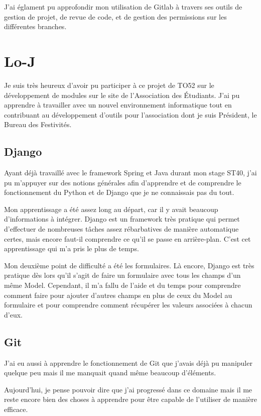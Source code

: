 \documentclass[a4paper]{report}
\begin{document}
\par J'ai églament pu approfondir mon utilisation de Gitlab à travers ses outils de gestion de projet, de revue de code,
et de gestion des permissions sur les différentes branches.

\section{Lo-J}
\label{sec:lo_j}
\par Je suis très heureux d'avoir pu participer à ce projet de TO52 sur le développement de modules sur le site de
l'Association des Étudiants. J'ai pu apprendre à travailler avec un nouvel environnement informatique tout en
contribuant au développement d'outils pour l'association dont je suis Président, le Bureau des Festivités.

\subsection{Django}
\par Ayant déjà travaillé avec le framework Spring et Java durant mon stage ST40, j'ai pu m'appuyer sur des notions
générales afin d'apprendre et de comprendre le fonctionnement du Python et de Django que je ne connaissais pas du tout.

\par Mon apprentissage a été assez long au départ, car il y avait beaucoup d'informations à intégrer. Django est un
framework très pratique qui permet d'effectuer de nombreuses tâches assez rébarbatives de manière automatique certes,
mais encore faut-il comprendre ce qu'il se passe en arrière-plan. C'est cet apprentissage qui m'a pris le plus de temps.

\par Mon deuxième point de difficulté a été les formulaires. Là encore, Django est très pratique dès lors qu'il s'agit
de faire un formulaire avec tous les champs d'un même Model. Cependant, il m'a fallu de l'aide et du temps pour
comprendre comment faire pour ajouter d'autres champs en plus de ceux du Model au formulaire et pour comprendre comment
récupérer les valeurs associées à chacun d'eux.

\subsection{Git}
\par J'ai eu aussi à apprendre le fonctionnement de Git que j'avais déjà pu manipuler quelque peu mais il me manquait
quand même beaucoup d'éléments.

\par Aujourd'hui, je pense pouvoir dire que j'ai progressé dans ce domaine mais il me reste encore bien des choses à
apprendre pour être capable de l'utiliser de manière efficace.
\end{document}
